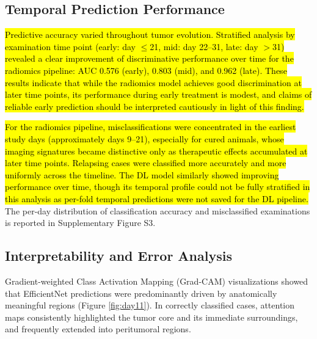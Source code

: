 \documentclass{article}
\begin{document}
\subsection{Temporal Prediction Performance}

\hl{Predictive accuracy varied throughout tumor evolution. Stratified analysis by examination time point (early: day $\leq$21, mid: day 22--31, late: day $>$31) revealed a clear improvement of discriminative performance over time for the radiomics pipeline: AUC 0.576 (early), 0.803 (mid), and 0.962 (late). These results indicate that while the radiomics model achieves good discrimination at later time points, its performance during early treatment is modest, and claims of reliable early prediction should be interpreted cautiously in light of this finding.}

\hl{For the radiomics pipeline, misclassifications were concentrated in the earliest study days (approximately days 9--21), especially for cured animals, whose imaging signatures became distinctive only as therapeutic effects accumulated at later time points. Relapsing cases were classified more accurately and more uniformly across the timeline. The DL model similarly showed improving performance over time, though its temporal profile could not be fully stratified in this analysis as per-fold temporal predictions were not saved for the DL pipeline.} The per-day distribution of classification accuracy and misclassified examinations is reported in Supplementary Figure S3.

\subsection{Interpretability and Error Analysis}

Gradient-weighted Class Activation Mapping (Grad-CAM) visualizations showed that EfficientNet predictions were predominantly driven by anatomically meaningful regions (Figure \ref{fig:day11}). In correctly classified cases, attention maps consistently highlighted the tumor core and its immediate surroundings, and frequently extended into peritumoral regions.
\end{document}
